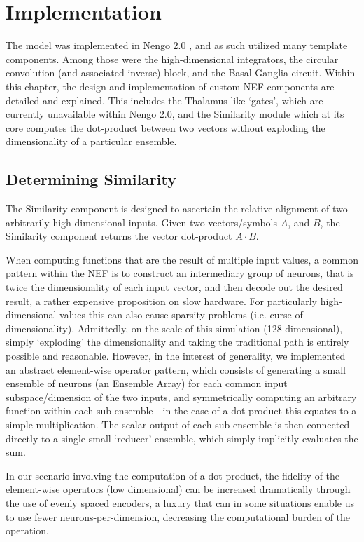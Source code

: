 \documentclass{report}
\begin{document}
\chapter{Implementation}

The model was implemented in Nengo 2.0 \cite{bekolay2014}, and as such utilized many template components.
Among those were the high-dimensional integrators, the circular convolution (and associated inverse) block, and the Basal Ganglia circuit.
Within this chapter, the design and implementation of custom NEF components are detailed and explained. 
This includes the Thalamus-like \lq{}gates\rq{}, which are currently unavailable within Nengo 2.0, and the Similarity module which at its core computes the dot-product between two vectors without exploding the dimensionality of a particular ensemble.

\section{Determining Similarity}
The Similarity component is designed to ascertain the relative alignment of two arbitrarily high-dimensional inputs.
Given two vectors/symbols $A$, and $B$, the Similarity component returns the vector dot-product $A \cdot B$.

When computing functions that are the result of multiple input values, a common pattern within the NEF is to construct an intermediary group of neurons, that is twice the dimensionality of each input vector, and then decode out the desired result, a rather expensive proposition on slow hardware.
For particularly high-dimensional values this can also cause sparsity problems (i.e. curse of dimensionality).
Admittedly, on the scale of this simulation (128-dimensional), simply \lq{}exploding\rq{} the dimensionality and taking the traditional path is entirely possible and reasonable.
However, in the interest of generality, we implemented an abstract element-wise operator pattern, which consists of generating a small ensemble of neurons (an Ensemble Array) for each common input subspace/dimension of the two inputs, and symmetrically computing an arbitrary function within each sub-ensemble---in the case of a dot product this equates to a simple multiplication.
The scalar output of each sub-ensemble is then connected directly to a single small \lq{}reducer\rq{} ensemble, which simply implicitly evaluates the sum.

In our scenario involving the computation of a dot product, the fidelity of the element-wise operators (low dimensional) can be increased dramatically through the use of evenly spaced encoders, a luxury that can in some situations enable us to use fewer neurons-per-dimension, decreasing the computational burden of the operation.
\end{document}
